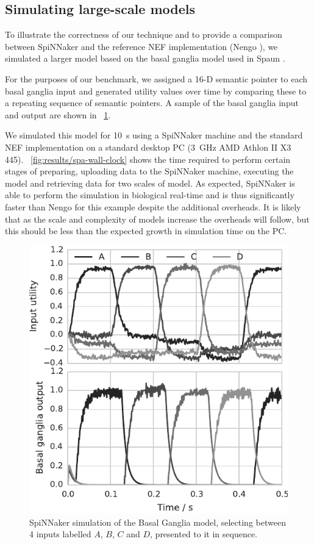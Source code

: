 \documentclass[conference]{IEEEtran}
\begin{document}
  \subsection{Simulating large-scale models}
  \label{sec:spa-sequence}

  To illustrate the correctness of our technique and to provide a comparison between SpiNNaker and the reference NEF implementation (Nengo \parencite{Bekolay2014}), we simulated a larger model based on the basal ganglia model used in Spaun \parencite{Stewart2010}.

  For the purposes of our benchmark, we assigned a 16-D semantic pointer to each basal ganglia input and generated utility values over time by comparing these to a repeating sequence of semantic pointers. A sample of the basal ganglia input and output are shown in \figurename~\ref{fig:results/basal_ganglia}.

  We simulated this model for \SI{10}{\second} using a SpiNNaker machine and the standard NEF implementation on a standard desktop PC (\SI{3}{\giga\hertz} AMD Athlon II X3 445).
  \figurename~\ref{fig:results/spa-wall-clock} shows the time required to perform certain stages of preparing, uploading data to the SpiNNaker machine, executing the model and retrieving data for two scales of model.
  As expected, SpiNNaker is able to perform the simulation in biological real-time and is thus significantly faster than Nengo for this example despite the additional overheads.
  It is likely that as the scale and complexity of models increase the overheads will follow, but this should be less than the expected growth in simulation time on the PC.

  \begin{figure}[!t]
    \includegraphics{figures/basal_ganglia}
    \caption{SpiNNaker simulation of the Basal Ganglia model, selecting between 4 inputs labelled $A$, $B$, $C$ and $D$, presented to it in sequence.}
    \label{fig:results/basal_ganglia}
  \end{figure}
\end{document}
